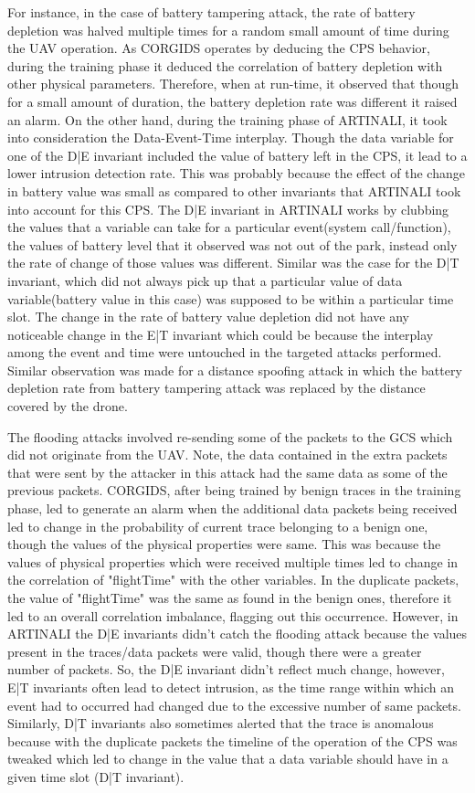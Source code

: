 For instance, in the case of battery tampering attack, the rate of battery depletion was halved multiple times for a random small amount of time during the UAV operation. As CORGIDS operates by deducing the CPS behavior, during the training phase it deduced the correlation of battery depletion with other physical parameters. Therefore, when at run-time, it observed that though for a small amount of duration, the battery depletion rate was different it raised an alarm. On the other hand, during the training phase of ARTINALI, it took into consideration the Data-Event-Time interplay. Though the data variable for one of the D|E invariant included the value of battery left in the CPS, it lead to a lower intrusion detection rate. This was probably because the effect of the change in battery value was small as compared to other invariants that ARTINALI took into account for this CPS. The D|E invariant in ARTINALI works by clubbing the values that a variable can take for a particular event(system call/function), the values of battery level that it observed was not out of the park, instead only the rate of change of those values was different. Similar was the case for the D|T invariant, which did not always pick up that a particular value of data variable(battery value in this case) was supposed to be within a particular time slot. The change in the rate of battery value depletion did not have any noticeable change in the E|T invariant which could be because the interplay among the event and time were untouched in the targeted attacks performed. Similar observation was made for a distance spoofing attack in which the battery depletion rate from battery tampering attack was replaced by the distance covered by the drone.

The flooding attacks involved re-sending some of the packets to the GCS which did not originate from the UAV. Note, the data contained in the extra packets that were sent by the attacker in this attack had the same data as some of the previous packets. CORGIDS, after being trained by benign traces in the training phase, led to generate an alarm when the additional data packets being received led to change in the probability of current trace belonging to a benign one, though the values of the physical properties were same. This was because the values of physical properties which were received multiple times led to change in the correlation of "flightTime" with the other variables. In the duplicate packets, the value of "flightTime" was the same as found in the benign ones, therefore it led to an overall correlation imbalance, flagging out this occurrence. However, in ARTINALI the D|E invariants didn't catch the flooding attack because the values present in the traces/data packets were valid, though there were a greater number of packets. So, the D|E invariant didn't reflect much change, however, E|T invariants often lead to detect intrusion, as the time range within which an event had to occurred had changed due to the excessive number of same packets. Similarly, D|T invariants also sometimes alerted that the trace is anomalous because with the duplicate packets the timeline of the operation of the CPS was tweaked which led to change in the value that a data variable should have in a given time slot (D|T invariant).


